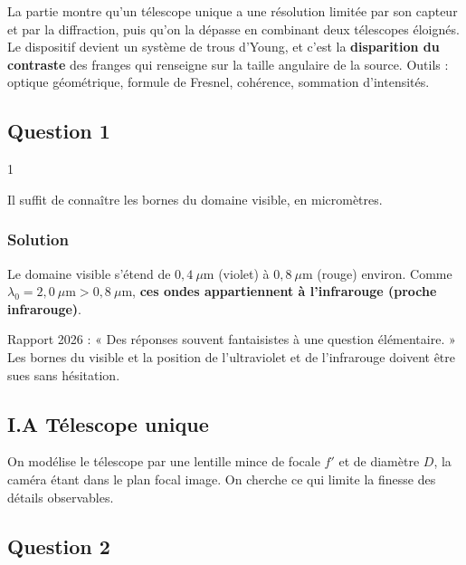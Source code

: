 \documentclass[11pt,a4paper]{article}
\begin{document}
La partie montre qu'un télescope unique a une résolution limitée par son capteur et par la diffraction, puis qu'on la dépasse en combinant deux télescopes éloignés. Le dispositif devient un système de trous d'Young, et c'est la \textbf{disparition du contraste} des franges qui renseigne sur la taille angulaire de la source. Outils : optique géométrique, formule de Fresnel, cohérence, sommation d'intensités.

\hypertarget{question-1}{%
\subsection{Question 1}\label{question-1}}

\begin{indication}{1}

Il suffit de connaître les bornes du domaine visible, en micromètres.

\end{indication}

\hypertarget{solution}{%
\subsubsection{Solution}\label{solution}}

Le domaine visible s'étend de \(0{,}4\ \mu\)m (violet) à \(0{,}8\ \mu\)m (rouge) environ. Comme \(\lambda_0=2{,}0\ \mu\mathrm m>0{,}8\ \mu\mathrm m\), \textbf{ces ondes appartiennent à l'infrarouge (proche infrarouge)}.

\begin{jury}

Rapport 2026 : « Des réponses souvent fantaisistes à une question élémentaire. » Les bornes du visible et la position de l'ultraviolet et de l'infrarouge doivent être sues sans hésitation.

\end{jury}

\hypertarget{i.a-tuxe9lescope-unique}{%
\subsection{I.A Télescope unique}\label{i.a-tuxe9lescope-unique}}

On modélise le télescope par une lentille mince de focale \(f'\) et de diamètre \(D\), la caméra étant dans le plan focal image. On cherche ce qui limite la finesse des détails observables.

\hypertarget{question-2}{%
\subsection{Question 2}\label{question-2}}
\end{document}

